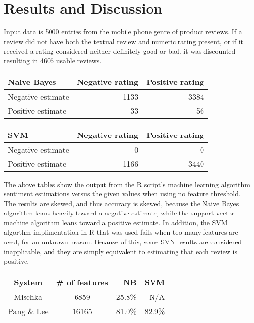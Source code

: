 \section{Results and Discussion}
Input data is 5000 entries from the mobile phone genre of product reviews. If a review did not have both the textual review and numeric rating present, or if it received a rating considered neither definitely good or bad, it was discounted resulting in 4606 usable reviews.

\begin{center}
\begin{tabular}{ | l | r | r | }
    \hline
    Naive Bayes & Negative rating & Positive rating \\ \hline
    Negative estimate & 1133 & 3384 \\ \hline
    Positive estimate & 33 & 56 \\
    \hline
\end{tabular}

\begin{tabular}{ | l | r | r | }
    \hline
    SVM & Negative rating & Positive rating \\ \hline
    Negative estimate & 0 & 0 \\ \hline
    Positive estimate & 1166 & 3440 \\
    \hline
\end{tabular}
\end{center}

The above tables show the output from the R script's machine learning algorithm sentiment estimations versus the given values when using no feature threshold. The results are skewed, and thus accuracy is skewed, because the Naive Bayes algorithm leans heavily toward a negative estimate, while the support vector machine algorithm leans toward a positive estimate. In addition, the SVM algorthm implimentation in R that was used fails when too many features are used, for an unknown reason. Because of this, some SVN results are considered inapplicable, and they are simply equivalent to estimating that each review is positive.

\begin{center}
\begin{tabular}{ | c | c || r | r | }
    \hline
    System & \# of features & NB & SVM \\ \hline
    Mischka & 6859 & 25.8\% & N/A \\ \hline
    Pang \& Lee &  16165 & 81.0\% & 82.9\% \\
    \hline
\end{tabular}
\end{center}

